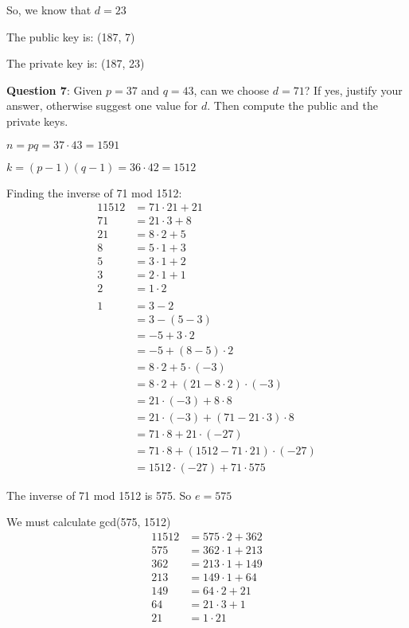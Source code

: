 \documentclass{article} %
\newcommand{\question}[2][]{\begin{flushleft}
        \textbf{Question #1}: #2

\end{flushleft}}
\begin{document}
    So, we know that $d = 23$

    The public key is: (187, 7)

    The private key is: (187, 23)

    \newpage

    \question[7]{Given $p = 37$ and $q = 43$, can we choose $d = 71$? If yes, justify your answer, 
    otherwise suggest one value for $d$. Then compute the public and the private keys.}

    $n = pq = 37 \cdot 43 = 1591$

    $k = (p-1)(q-1) = 36 \cdot 42 = 1512$

    Finding the inverse of 71 mod 1512:
    \begin{alignat*}{1}
        1512 &= 71 \cdot 21 + 21\\
        71   &= 21 \cdot 3 + 8\\
        21   &= 8 \cdot 2 + 5\\
        8    &= 5 \cdot 1 + 3\\
        5    &= 3 \cdot 1 + 2\\
        3    &= 2 \cdot 1 + 1\\
        2    &= 1 \cdot 2\\
        \\
        1 &= 3 - 2\\
          &= 3 - (5 - 3)\\
          &= -5 + 3 \cdot 2\\
          &= -5 + (8 - 5) \cdot 2\\
          &= 8 \cdot 2 + 5 \cdot (-3)\\
          &= 8 \cdot 2 + (21 - 8 \cdot 2) \cdot (-3)\\
          &= 21 \cdot (-3) + 8 \cdot 8\\
          &= 21 \cdot (-3) + (71 - 21 \cdot 3) \cdot 8\\
          &= 71 \cdot 8 + 21 \cdot (-27)\\
          &= 71 \cdot 8 + (1512 - 71 \cdot 21) \cdot (-27)\\
          &= 1512 \cdot (-27) + 71 \cdot 575
    \end{alignat*}

    The inverse of 71 mod 1512 is 575. So $e = 575$ 

    We must calculate gcd(575, 1512)
    \begin{alignat*}{1}
        1512 &= 575 \cdot 2 + 362\\
        575 &= 362 \cdot 1 + 213\\
        362 &= 213 \cdot 1 + 149\\
        213 &= 149 \cdot 1 + 64\\
        149 &= 64 \cdot 2 + 21\\
        64 &= 21 \cdot 3 + 1\\
        21 &= 1 \cdot 21
    \end{alignat*}
\end{document}
